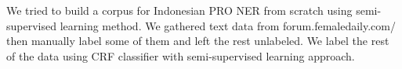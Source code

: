 We tried to build a corpus for Indonesian PRO NER from scratch using semi-supervised learning method. We gathered text data from forum.femaledaily.com/ then manually label some of them and left the rest unlabeled. We label the rest of the data using CRF classifier with semi-supervised learning approach.
